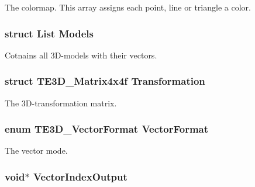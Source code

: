The colormap. This array assigns each point, line or triangle a color. 

\hypertarget{struct_t_e3_d___pipeline_a83a7e2814c3565a16a3f99d0fe61d130}{
\subsubsection[{Models}]{\setlength{\rightskip}{0pt plus 5cm}struct {\bf List} Models}}\label{struct_t_e3_d___pipeline_a83a7e2814c3565a16a3f99d0fe61d130}


Cotnains all 3\-D-\/models with their vectors. 

\hypertarget{struct_t_e3_d___pipeline_a18ddbbc6401acb6e43259850e1e581ef}{
\subsubsection[{Transformation}]{\setlength{\rightskip}{0pt plus 5cm}struct {\bf T\-E3\-D\-\_\-\-Matrix4x4f} Transformation}}\label{struct_t_e3_d___pipeline_a18ddbbc6401acb6e43259850e1e581ef}


The 3\-D-\/transformation matrix. 

\hypertarget{struct_t_e3_d___pipeline_a422631c708e3e0e6bb3bf305e9914418}{
\subsubsection[{Vector\-Format}]{\setlength{\rightskip}{0pt plus 5cm}enum {\bf T\-E3\-D\-\_\-\-Vector\-Format} Vector\-Format}}\label{struct_t_e3_d___pipeline_a422631c708e3e0e6bb3bf305e9914418}


The vector mode. 

\hypertarget{struct_t_e3_d___pipeline_ad8118d66dd301ae8c3c169705afc0096}{
\subsubsection[{Vector\-Index\-Output}]{\setlength{\rightskip}{0pt plus 5cm}void$\ast$ Vector\-Index\-Output}}\label{struct_t_e3_d___pipeline_ad8118d66dd301ae8c3c169705afc0096}



